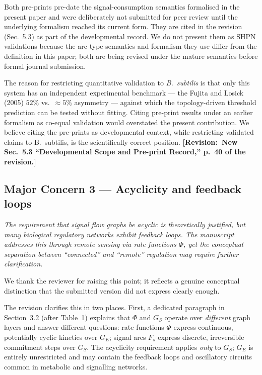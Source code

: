 \documentclass[11pt,letterpaper]{article}
\newcommand{\rquote}[1]{\begin{mdframed}[style=reviewquote]\textit{#1}\end{mdframed}}
\newcommand{\sref}[1]{\textbf{[Revision:~#1]}}
\begin{document}
Both pre-prints pre-date the signal-consumption semantics formalised in the
present paper and were deliberately not submitted for peer review until the
underlying formalism reached its current form. They are cited in the revision
(Sec.~5.3) as part of the developmental record. We do not present them as
SHPN validations because the arc-type semantics and formalism they use differ
from the definition in this paper; both are being revised under the mature
semantics before formal journal submission.

The reason for restricting quantitative validation to \textit{B.\ subtilis}
is that only this system has an independent experimental benchmark --- the
Fujita and Losick (2005) $52\%$ vs.\ $\approx 5\%$ asymmetry --- against which
the topology-driven threshold prediction can be tested without fitting. Citing
pre-print results under an earlier formalism as co-equal validation would
overstated the present contribution. We believe citing the pre-prints as
developmental context, while restricting validated claims to B.~subtilis, is
the scientifically correct position.
\sref{New Sec.~5.3 ``Developmental Scope and Pre-print Record,'' p.~40 of the revision.}

\subsection*{Major Concern 3 --- Acyclicity and feedback loops}

\rquote{The requirement that signal flow graphs be acyclic is theoretically
justified, but many biological regulatory networks exhibit feedback loops. The
manuscript addresses this through remote sensing via rate functions $\Phi$, yet
the conceptual separation between ``connected'' and ``remote'' regulation may
require further clarification.}

We thank the reviewer for raising this point; it reflects a genuine conceptual
distinction that the submitted version did not express clearly enough.

The revision clarifies this in two places. First, a dedicated paragraph in
Section~3.2 (after Table~1) explains that $\Phi$ and $G_S$ operate over
\emph{different} graph layers and answer different questions: rate functions
$\Phi$ express continuous, potentially cyclic kinetics over $G_E$; signal arcs
$F_s$ express discrete, irreversible commitment steps over $G_S$. The
acyclicity requirement applies \emph{only} to $G_S$; $G_E$ is entirely
unrestricted and may contain the feedback loops and oscillatory circuits common
in metabolic and signalling networks.
\end{document}
